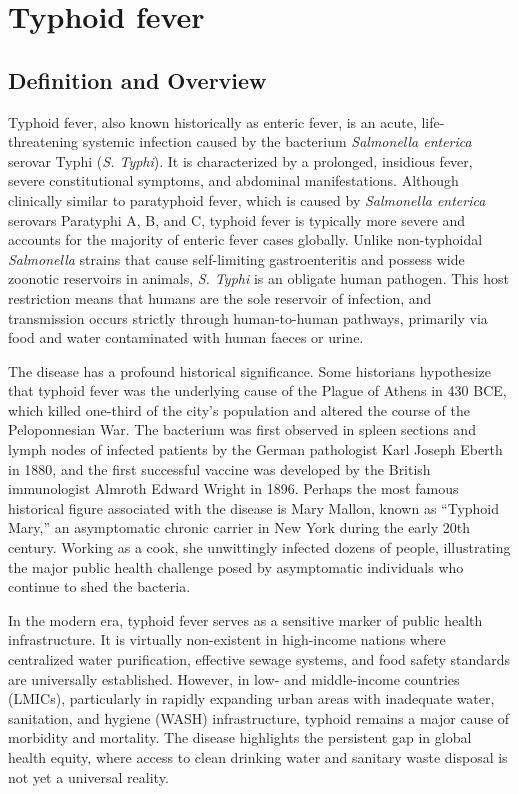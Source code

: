 \chapter{Typhoid fever}

\section*{Definition and Overview}
Typhoid fever, also known historically as enteric fever, is an acute, life-threatening systemic infection caused by the bacterium \textit{Salmonella enterica} serovar Typhi (\textit{S. Typhi}). It is characterized by a prolonged, insidious fever, severe constitutional symptoms, and abdominal manifestations. Although clinically similar to paratyphoid fever, which is caused by \textit{Salmonella enterica} serovars Paratyphi A, B, and C, typhoid fever is typically more severe and accounts for the majority of enteric fever cases globally. Unlike non-typhoidal \textit{Salmonella} strains that cause self-limiting gastroenteritis and possess wide zoonotic reservoirs in animals, \textit{S. Typhi} is an obligate human pathogen. This host restriction means that humans are the sole reservoir of infection, and transmission occurs strictly through human-to-human pathways, primarily via food and water contaminated with human faeces or urine.

The disease has a profound historical significance. Some historians hypothesize that typhoid fever was the underlying cause of the Plague of Athens in 430 BCE, which killed one-third of the city's population and altered the course of the Peloponnesian War. The bacterium was first observed in spleen sections and lymph nodes of infected patients by the German pathologist Karl Joseph Eberth in 1880, and the first successful vaccine was developed by the British immunologist Almroth Edward Wright in 1896. Perhaps the most famous historical figure associated with the disease is Mary Mallon, known as ``Typhoid Mary,'' an asymptomatic chronic carrier in New York during the early 20th century. Working as a cook, she unwittingly infected dozens of people, illustrating the major public health challenge posed by asymptomatic individuals who continue to shed the bacteria.

In the modern era, typhoid fever serves as a sensitive marker of public health infrastructure. It is virtually non-existent in high-income nations where centralized water purification, effective sewage systems, and food safety standards are universally established. However, in low- and middle-income countries (LMICs), particularly in rapidly expanding urban areas with inadequate water, sanitation, and hygiene (WASH) infrastructure, typhoid remains a major cause of morbidity and mortality. The disease highlights the persistent gap in global health equity, where access to clean drinking water and sanitary waste disposal is not yet a universal reality.

